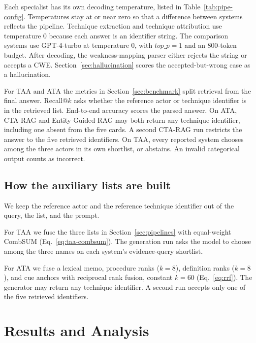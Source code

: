 \documentclass[5p,times,authoryear]{elsarticle}
\begin{document}
Each specialist has its own decoding temperature, listed in Table~\ref{tab:pipe-config}. Temperatures stay at or near zero so that a difference between systems reflects the pipeline. Technique extraction and technique attribution use temperature $0$ because each answer is an identifier string. The comparison systems use GPT-4-turbo at temperature $0$, with $top\_p{=}1$ and an 800-token budget. After decoding, the weakness-mapping parser either rejects the string or accepts a CWE. Section~\ref{sec:hallucination} scores the accepted-but-wrong case as a hallucination.

For TAA and ATA the metrics in Section~\ref{sec:benchmark} split retrieval from the final answer. Recall@$k$ asks whether the reference actor or technique identifier is in the retrieved list. End-to-end accuracy scores the parsed answer. On ATA, CTA-RAG and Entity-Guided RAG may both return any technique identifier, including one absent from the five cards. A second CTA-RAG run restricts the answer to the five retrieved identifiers. On TAA, every reported system chooses among the three actors in its own shortlist, or abstains. An invalid categorical output counts as incorrect.

\subsection{How the auxiliary lists are built}\label{sec:taa-ata-pipeline}
We keep the reference actor and the reference technique identifier out of the query, the list, and the prompt.

For TAA we fuse the three lists in Section~\ref{sec:pipelines} with equal-weight CombSUM (Eq.~\eqref{eq:taa-combsum}). The generation run asks the model to choose among the three names on each system's evidence-query shortlist.

For ATA we fuse a lexical memo, procedure ranks ($k{=}8$), definition ranks ($k{=}8$), and cue anchors with reciprocal rank fusion, constant $k{=}60$ (Eq.~\eqref{eq:rrf}). The generator may return any technique identifier. A second run accepts only one of the five retrieved identifiers.




\section{Results and Analysis}\label{sec:results}
\end{document}
